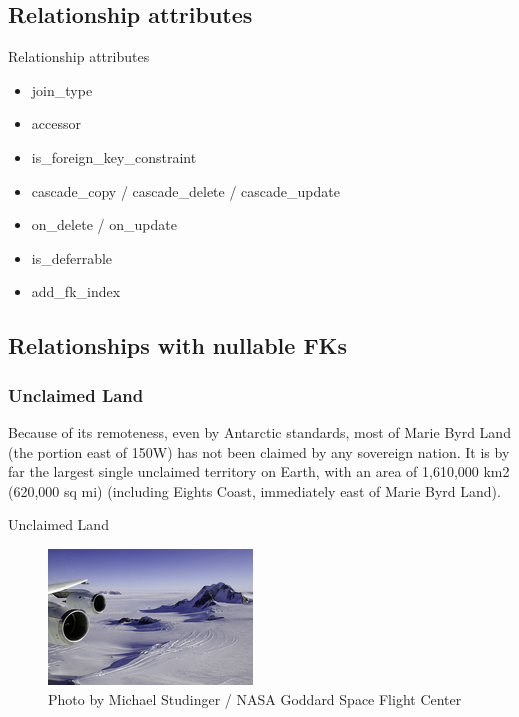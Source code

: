\subsection{Relationship attributes}


\begin{frame}{Relationship attributes}
\begin{itemize}
\item join\_type
\item accessor
\item is\_foreign\_key\_constraint
\item cascade\_copy / cascade\_delete / cascade\_update
\item on\_delete / on\_update
\item is\_deferrable
\item add\_fk\_index
\end{itemize}
\end{frame}

\subsection{Relationships with nullable FKs}


\subsubsection{Unclaimed Land}

Because of its remoteness, even by Antarctic standards, most of Marie Byrd
Land (the portion east of 150\degree{}W) has not been claimed by any sovereign
nation. It is by far the largest single unclaimed territory on Earth, with
an area of 1,610,000 km2 (620,000 sq mi) (including Eights Coast,
immediately east of Marie Byrd Land).

\begin{frame}{Unclaimed Land}
  \begin{figure}[!ht]
    \begin{center}
\includegraphics{img/Marie_Byrd_Land.jpg}
\caption[Marie Byrd Land]{Photo by Michael Studinger / NASA
  Goddard Space Flight Center}
    \end{center}
\end{figure}
\end{frame}

